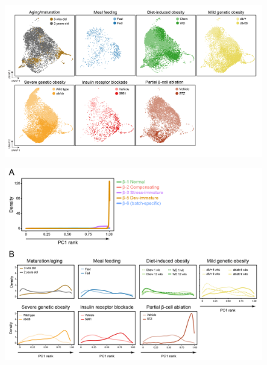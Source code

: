 


\begin{figure}[H]
\centering
\includegraphics[width=\linewidth]{Appendix2/Fig/F3-4-01.png}
\caption[β-cell subset across seven studies]{}
\label{suppl_fig:chp3_betastudy}
\end{figure}



\begin{figure}[H]
\centering
\includegraphics[width=\linewidth]{Appendix2/Fig/F3-7-02.png}
\caption[Loss of β-cell maturity across studies along PC1]{}
\label{suppl_fig:chp3_pc1}
\end{figure}


